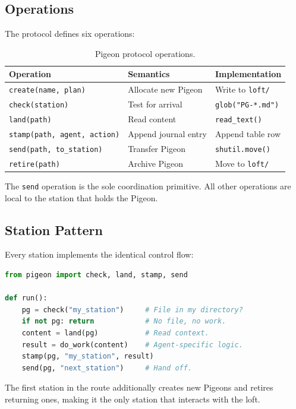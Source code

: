 \documentclass[11pt,a4paper]{article}
\begin{document}
\subsection{Operations}

The protocol defines six operations:

\begin{table}[h]
\centering
\begin{tabular}{lll}
\toprule
\textbf{Operation} & \textbf{Semantics} & \textbf{Implementation} \\
\midrule
\texttt{create(name, plan)} & Allocate new Pigeon & Write to \texttt{loft/} \\
\texttt{check(station)} & Test for arrival & \texttt{glob("PG-*.md")} \\
\texttt{land(path)} & Read content & \texttt{read\_text()} \\
\texttt{stamp(path, agent, action)} & Append journal entry & Append table row \\
\texttt{send(path, to\_station)} & Transfer Pigeon & \texttt{shutil.move()} \\
\texttt{retire(path)} & Archive Pigeon & Move to \texttt{loft/} \\
\bottomrule
\end{tabular}
\caption{Pigeon protocol operations.}
\end{table}

The \texttt{send} operation is the sole coordination primitive. All other operations are local to the station that holds the Pigeon.

\subsection{Station Pattern}

Every station implements the identical control flow:

\begin{lstlisting}[language=Python]
from pigeon import check, land, stamp, send

def run():
    pg = check("my_station")     # File in my directory?
    if not pg: return            # No file, no work.
    content = land(pg)           # Read context.
    result = do_work(content)    # Agent-specific logic.
    stamp(pg, "my_station", result)
    send(pg, "next_station")     # Hand off.
\end{lstlisting}

The first station in the route additionally creates new Pigeons and retires returning ones, making it the only station that interacts with the loft.
\end{document}
